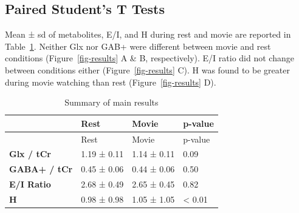 \documentclass[
true
]{sn-jnl}
\begin{document}
\begin{figure}[H]
\end{figure}%

\subsection{Paired Student's T Tests}\label{paired-students-t-tests}

Mean ± sd of metabolites, E/I, and H during rest and movie are reported
in Table~\ref{tbl-results}. Neither Glx nor GAB+ were different between
movie and rest conditions (Figure~\ref{fig-results} A \& B,
respectively). E/I ratio did not change between conditions either
(Figure~\ref{fig-results} C). H was found to be greater during movie
watching than rest (Figure~\ref{fig-results} D).

\begin{longtable}[]{@{}llll@{}}
\caption{Summary of main results}\label{tbl-results}\tabularnewline
\toprule\noalign{}
& Rest & Movie & p-value \\
\midrule\noalign{}
\endfirsthead
\toprule\noalign{}
& Rest & Movie & p-value \\
\midrule\noalign{}
\endhead
\bottomrule\noalign{}
\endlastfoot
\textbf{Glx / tCr} & 1.19 ± 0.11 & 1.14 ± 0.11 & 0.09 \\
\textbf{GABA+ / tCr} & 0.45 ± 0.06 & 0.44 ± 0.06 & 0.50 \\
\textbf{E/I Ratio} & 2.68 ± 0.49 & 2.65 ± 0.45 & 0.82 \\
\textbf{H} & 0.98 ± 0.98 & 1.05 ± 1.05 & \textless{} 0.01 \\
\end{longtable}
\end{document}
